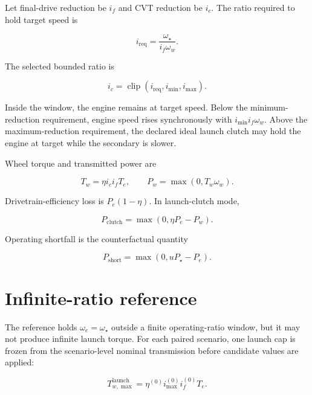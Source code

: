 \documentclass[11pt,oneside]{report}
\begin{document}
Let final-drive reduction be $i_f$ and CVT reduction be $i_c$.  The ratio required to
hold target speed is

\begin{equation}
i_{\mathrm{req}}=\frac{\omega_\star}{i_f\omega_w}.
\end{equation}

The selected bounded ratio is

\begin{equation}
i_c=\operatorname{clip}(i_{\mathrm{req}},i_{\min},i_{\max}).
\label{eq:bounded-ratio}
\end{equation}

Inside the window, the engine remains at target speed.  Below the minimum-reduction
requirement, engine speed rises synchronously with $i_{\min}i_f\omega_w$.  Above the
maximum-reduction requirement, the declared ideal launch clutch may hold the engine at
target while the secondary is slower.

Wheel torque and transmitted power are

\begin{equation}
T_w=\eta i_c i_f T_e,\qquad P_w=\max(0,T_w\omega_w).
\end{equation}

Drivetrain-efficiency loss is $P_e(1-\eta)$.  In launch-clutch mode,

\begin{equation}
P_{\mathrm{clutch}}=\max(0,\eta P_e-P_w).
\end{equation}

Operating shortfall is the counterfactual quantity

\begin{equation}
P_{\mathrm{short}}=\max(0,uP_\star-P_e).
\end{equation}

\section{Infinite-ratio reference}

The reference holds $\omega_e=\omega_\star$ outside a finite operating-ratio window,
but it may not produce infinite launch torque. For each paired scenario, one launch cap
is frozen from the scenario-level nominal transmission before candidate values are
applied:

\begin{equation}
T_{w,\max}^{\mathrm{launch}}=\eta^{(0)} i_{\max}^{(0)}i_f^{(0)}T_e.
\end{equation}
\end{document}
